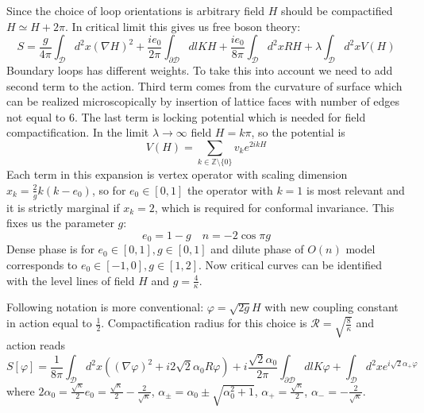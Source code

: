 \documentclass[12pt]{article}
\begin{document}
Since the choice of loop orientations is arbitrary field $H$ should be compactified $H\simeq
H+2\pi$.
 In critical limit this gives us free boson theory:
\begin{equation}
  \label{eq:126}
  S=\frac{g}{4\pi} \int_{\mathcal{D}} d^{2}x (\nabla H)^{2} +\frac{i e_{0}}{2\pi}
  \int_{\partial\mathcal{D}} dl KH +\frac{i e_{0}}{8\pi} \int_{\mathcal{D}} d^{2}x
  RH+\lambda\int_{\mathcal{D}} d^{2}x V(H)
\end{equation}
Boundary loops has different weights. To take this into account we need to add second term to the
action. Third term comes from the curvature of surface which can be realized microscopically by
insertion of lattice faces with number of edges not equal to 6. The last term is locking potential
which is needed for field compactification. In the limit $\lambda\to\infty$ field $H=k\pi$, so the
potential is
\begin{equation}
  \label{eq:127}
  V(H)=\sum_{k\in\mathbb{Z}\setminus \{0\}}v_{k}e^{2ikH}
\end{equation}
Each term in this expansion is vertex operator with scaling dimension $x_{k}=\frac{2}{g}k(k-e_{0})$,
so for $e_{0}\in [0,1]$ the operator with $k=1$ is most relevant and it is strictly marginal if
$x_{k}=2$, which is required for conformal invariance. This fixes us the parameter $g$:
\begin{equation}
  \label{eq:128}
  e_{0}=1-g\quad n=-2\cos \pi g
\end{equation}
Dense phase is for $e_{0}\in [0,1], g\in [0,1]$ and dilute phase of $O(n)$ model corresponds to
$e_{0}\in [-1,0], g\in [1,2]$.
Now critical curves can be identified with the level lines of field $H$ and $g=\frac{4}{\kappa}$. 

Following notation is more conventional:
$\varphi=\sqrt{2g}H$ with new coupling constant in action equal to $\frac{1}{2}$. Compactification
radius for this choice is $\mathcal{R}=\sqrt{\frac{8}{\kappa}}$ and action reads
\begin{equation}
  \label{eq:129}
  S[\varphi]=\frac{1}{8\pi}\int_{\mathcal{D}}d^{2}x ((\nabla \varphi)^{2} + i2\sqrt{2} \alpha_{0}
  R\varphi)+i\frac{\sqrt{2}\alpha_{0}}{2\pi} \int_{\partial\mathcal{D}} dl
  K\varphi+\int_{\mathcal{D}}d^{2}x e^{i\sqrt{2}\alpha_{+}\varphi}
\end{equation}
where $2\alpha_{0}=\frac{\sqrt{\kappa}}{2}e_{0}=\frac{\sqrt{\kappa}}{2}-\frac{2}{\sqrt{\kappa}}$,
$\alpha_{\pm}=\alpha_{0}\pm\sqrt{\alpha_{0}^{2}+1}$, $\alpha_{+}=\frac{\sqrt{\kappa}}{2}$,
$\alpha_{-}=-\frac{2}{\sqrt{\kappa}}$. 
\end{document}
